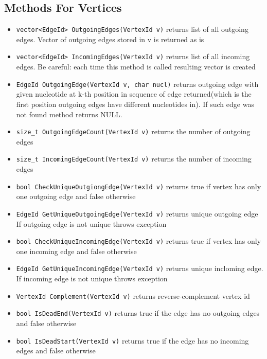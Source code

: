 \documentclass[a4paper,10pt]{article}
\begin{document}
\subsection*{Methods For Vertices}
\begin{itemize}
\item \texttt{vector<EdgeId> OutgoingEdges(VertexId v)} returns list of all outgoing edges. Vector of outgoing edges stored 
in v is returned as is
\item \texttt{vector<EdgeId> IncomingEdges(VertexId v)} returns list of all incoming edges. Be careful: each time this method 
is called resulting vector is created
\item \texttt{EdgeId OutgoingEdge(VertexId v, char nucl)} returns outgoing edge with given nucleotide at k-th position in sequence of
edge returned(which is the first position outgoing edges have different nucleotides in).
If such edge was not found method returns NULL.
\item \texttt{size\_t OutgoingEdgeCount(VertexId v)} returns the number of outgoing edges
\item \texttt{size\_t IncomingEdgeCount(VertexId v)} returns the number of incoming edges

\item \texttt{bool CheckUniqueOutgiongEdge(VertexId v)} returns true if vertex has only one outgoing edge and false otherwise
\item \texttt{EdgeId GetUniqueOutgoingEdge(VertexId v)} returns unique outgoing edge
If outgoing edge is not unique throws exception
\item \texttt{bool CheckUniqueIncomingEdge(VertexId v)} returns true if vertex has only one incoming edge and false otherwise
\item \texttt{EdgeId GetUniqueIncomingEdge(VertexId v)} returns unique incloming edge. 
If incoming edge is not unique throws exception
\item \texttt{VertexId Complement(VertexId v)} returns reverse-complement vertex id
\item \texttt{bool IsDeadEnd(VertexId v)} returns true if the edge has no outgoing edges and false otherwise
\item \texttt{bool IsDeadStart(VertexId v)} returns true if the edge has no incoming edges and false otherwise 
\end{itemize}
\end{document}

